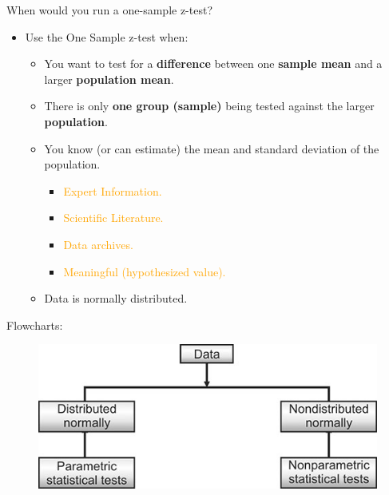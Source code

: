 \documentclass[
  ignorenonframetext,
]{beamer}
\providecommand{\tightlist}{%
  \setlength{\itemsep}{0pt}\setlength{\parskip}{0pt}}
\begin{document}
\begin{frame}{When would you run a one-sample z-test?}
\label{when-would-you-run-a-one-sample-z-test-1}
\begin{itemize}
\tightlist
\item
  Use the One Sample z-test when:

  \begin{itemize}
  \tightlist
  \item
    You want to test for a \textbf{difference} between one
    \textbf{sample mean} and a larger \textbf{population mean}.
  \item
    There is only \textbf{one group (sample)} being tested against the
    larger \textbf{population}.
  \item
    You know (or can estimate) the mean and standard deviation of the
    population.

    \begin{itemize}
    \tightlist
    \item
      \textcolor{orange}{Expert Information.}
    \item
      \textcolor{orange}{Scientific Literature.}
    \item
      \textcolor{orange}{Data archives.}
    \item
      \textcolor{orange}{Meaningful (hypothesized value).}
    \end{itemize}
  \item
    Data is normally distributed.
  \end{itemize}
\end{itemize}
\end{frame}

\begin{frame}{Flowcharts:}
\label{flowcharts}
\begin{figure}

{\centering \includegraphics[width=0.6\linewidth]{fig/parametric} 

}

\end{figure}
\end{frame}
\end{document}
